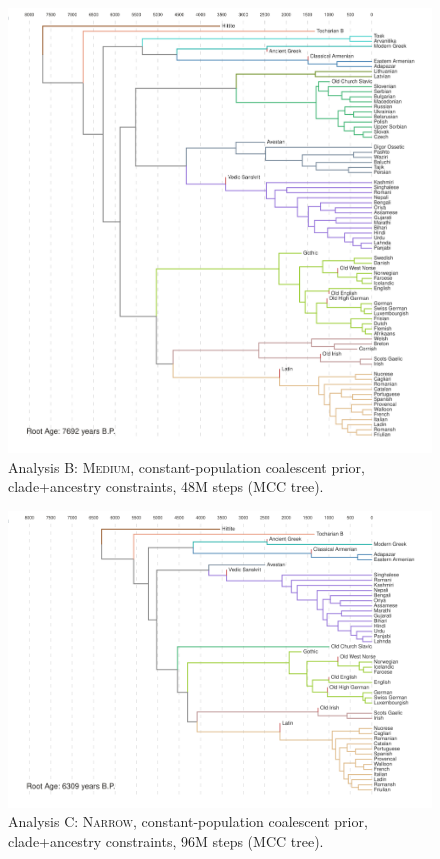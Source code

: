 \documentclass[10pt,journal,compsoc]{IEEEtran}
\begin{document}
\begin{figure}
    \caption{Analysis B: \textsc{Medium}, constant-population coalescent prior, clade+ancestry constraints, 48M steps (MCC tree).}\label{fig:analysisB}
    \includegraphics[width=\textwidth, center]{runs24-medium-constant}
\end{figure}

\begin{figure}
    \caption{Analysis C: \textsc{Narrow}, constant-population coalescent prior, clade+ancestry constraints, 96M steps (MCC tree).}\label{fig:analysisC}
    \includegraphics[width=\textwidth, center]{runs24-narrow-constant}
\end{figure}
\end{document}
